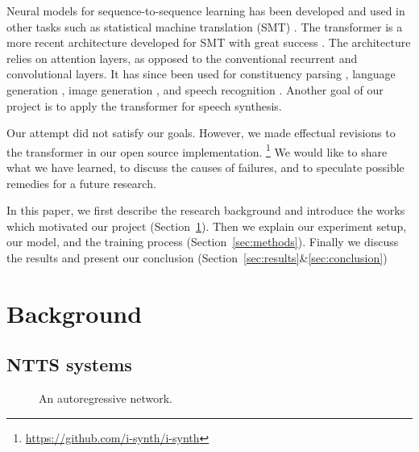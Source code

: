 \documentclass[11pt]{article}
\begin{document}
Neural models for sequence-to-sequence learning has been developed and used in other tasks
such as statistical machine translation (SMT) \parencite{cho2014learning, sutskever2014sequence}.
The transformer is a more recent architecture developed for SMT with great success \parencite{vaswani2017attention}.
The architecture relies on attention layers,
as opposed to the conventional recurrent and convolutional layers.
It has since been used for constituency parsing \parencite{kitaev2018constituency},
language generation \parencite{liu2018generating},
image generation \parencite{parmar2018image},
and speech recognition \parencite{zhou2018syllable, zhou2018multilingual}.
Another goal of our project is to apply the transformer for speech synthesis.

Our attempt did not satisfy our goals.
However, we made effectual revisions to the transformer in our open source implementation.%
\footnote{\url{https://github.com/i-synth/i-synth}}
We would like to share what we have learned,
to discuss the causes of failures,
and to speculate possible remedies for a future research.

In this paper, we first describe the research background
and introduce the works which motivated our project (Section~\ref{sec:background}).
Then we explain our experiment setup, our model,
and the training process (Section~\ref{sec:methods}).
Finally we discuss the results and present our conclusion
(Section~\ref{sec:results}\&\ref{sec:conclusion})

\section{Background}\label{sec:background}

\subsection{NTTS systems}

\begin{figure}
  \centering
  \caption[]{\label{fig:autoreg}An autoregressive network.}
\end{figure}
\end{document}
